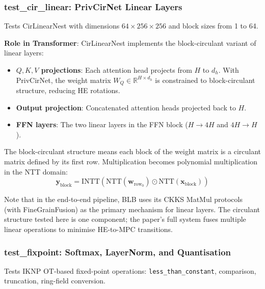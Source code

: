 \subsubsection{test\_cir\_linear: PrivCirNet Linear Layers}

Tests CirLinearNest with dimensions $64 \times 256 \times 256$ and block sizes from 1 to 64.

\textbf{Role in Transformer}: CirLinearNest implements the block-circulant variant of linear layers:
\begin{itemize}[nosep]
  \item \textbf{$Q, K, V$ projections}: Each attention head projects from $H$ to $d_h$. With PrivCirNet, the weight matrix $W_Q \in \mathbb{R}^{H \times d_h}$ is constrained to block-circulant structure, reducing HE rotations.
  \item \textbf{Output projection}: Concatenated attention heads projected back to $H$.
  \item \textbf{FFN layers}: The two linear layers in the FFN block ($H \to 4H$ and $4H \to H$).
\end{itemize}

The block-circulant structure means each block of the weight matrix is a circulant matrix defined by its first row.
Multiplication becomes polynomial multiplication in the NTT domain:
\[
\mathbf{y}_{\text{block}} = \text{INTT}(\text{NTT}(\mathbf{w}_{\text{row}_0}) \odot \text{NTT}(\mathbf{x}_{\text{block}}))
\]

Note that in the end-to-end pipeline, BLB uses its CKKS MatMul protocols (with FineGrainFusion) as the primary mechanism for linear layers.
The circulant structure tested here is one component; the paper's full system fuses multiple linear operations to minimise HE-to-MPC transitions.

\subsubsection{test\_fixpoint: Softmax, LayerNorm, and Quantisation}

Tests IKNP OT-based fixed-point operations: \texttt{less\_than\_constant}, comparison, truncation, ring-field conversion.

